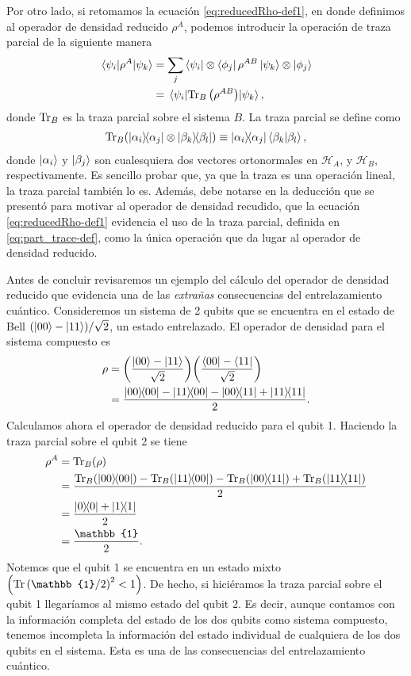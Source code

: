 Por otro lado, si retomamos la ecuación \eqref{eq:reducedRho-def1},
en donde definimos al operador de densidad reducido $\rho^A$, podemos
introducir la operación de traza parcial de la siguiente manera
\begin{align}
	\matrixel{\psi_i}{\rho^A}{\psi_k} &= 
	\sum _j \bra{\psi_i}\ten\bra{\phi_j}\rho^{AB}\ket{\psi_k}\ten\ket{\phi_j}\\
	&=\matrixel{\psi_i}{\Tr_B\qty(\rho^{AB})}{\psi_k},
	\label{eq:partialTrace-def}
\end{align}
donde $\Tr_B$ es la traza parcial sobre el sistema $B$. La traza parcial
se define como \cite{nielsen_chuang_2011}
\begin{align}
	\Tr_B (\dyad{\alpha_i}{\alpha_j}\otimes \dyad{\beta_k}{\beta_l})
	\equiv
	\dyad{\alpha_i}{\alpha_j}\braket{\beta_k}{\beta_l},
	\label{eq:part_trace-def}
\end{align}
donde $\ket{\alpha_i}$ y $\ket{\beta_j}$ son cualesquiera dos vectores
ortonormales en
$\mathcal{H}_A$, y $\mathcal{H}_B$, respectivamente. Es sencillo probar
que, ya que la traza es una operación lineal, la traza parcial también 
lo es. 
Además, debe notarse en la deducción que se presentó para motivar 
al operador de densidad recudido, 
que la ecuación \eqref{eq:reducedRho-def1} evidencia 
el uso de la traza parcial, definida en \eqref{eq:part_trace-def}, 
como la única operación que da lugar al operador de densidad reducido. 

Antes de concluir revisaremos un ejemplo del cálculo del 
operador de densidad reducido que evidencia una de las
\textit{extrañas} consecuencias del
entrelazamiento cuántico.
Consideremos un sistema de 2 qubits que se encuentra en el estado de Bell
$\qty(\ket{00}-\ket{11})/\sqrt{2}$, un estado entrelazado. El operador
de densidad para el sistema compuesto es
\begin{align}
	\rho &= \qty(\frac{\ket{00}-\ket{11}}{\sqrt{2}})
	\qty(\frac{\bra{00}-\bra{11}}{\sqrt{2}}) \\
			 &= \frac{\dyad{00}{00}-\dyad{11}{00}-\dyad{00}{11}+\dyad{11}{11}}{2}.
\end{align}
Calculamos ahora el operador de densidad reducido para el qubit 1.  
Haciendo la traza parcial sobre el qubit 2 se tiene
\begin{align}
	\rho^A &= \Tr _B(\rho) \\
			 	 &= \frac{\Tr _B(\dyad{00}{00})-\Tr _B(\dyad{11}{00})
			 	 -\Tr _B(\dyad{00}{11})+\Tr _B(\dyad{11}{11})}{2} \\
			 	 &= \frac{\dyad{0}{0} + \dyad{1}{1}}{2} \\
			 	 &= \frac{\mathbb{1}}{2}.
\end{align}
Notemos que el qubit 1 se encuentra en un estado mixto
$\qty(\Tr \qty(\mathbb{1}/2)^2<1)$. De hecho, si hiciéramos la 
traza parcial sobre el qubit 1 llegaríamos al mismo estado del qubit 2.
Es decir, aunque contamos con la información completa del estado 
de los dos qubits como sistema compuesto, tenemos incompleta la 
información del estado individual de cualquiera de los dos qubits
en el sistema. Esta es una de las consecuencias del entrelazamiento
cuántico.


